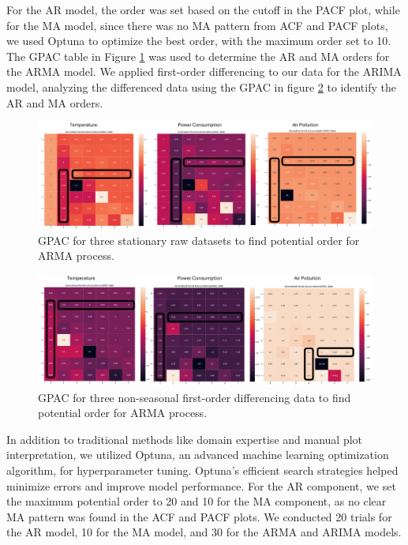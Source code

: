 \documentclass[sn-mathphys-num]{sn-jnl}
\theoremstyle{thmstyleone}%
\theoremstyle{thmstyletwo}%
\theoremstyle{thmstylethree}%
\begin{document}
For the AR model, the order was set based on the cutoff in the PACF plot, while for the MA model, since there was no MA pattern from ACF and PACF plots, we used Optuna to optimize the best order, with the maximum order set to 10. The GPAC table in Figure \ref{fig:gpac1}  was used to determine the AR and MA orders for the ARMA model. We applied first-order differencing to our data for the ARIMA model, analyzing the differenced data using the GPAC in figure \ref{fig:gpac2} to identify the AR and MA orders.
\begin{figure}[H]
	\begin{center}
		\includegraphics[scale=0.6]{gpac1.pdf}
	\end{center}
	\caption{GPAC for three stationary raw datasets to find potential order for ARMA process.}
	\label{fig:gpac1}
\end{figure}

\begin{figure}[H]
	\begin{center}
		\includegraphics[scale=0.6]{./gpac2.pdf}
	\end{center}
	\caption{GPAC for three non-seasonal first-order differencing data to find potential order for ARMA process.}
	\label{fig:gpac2}
\end{figure}

In addition to traditional methods like domain expertise and manual plot interpretation, we utilized Optuna, an advanced machine learning optimization algorithm, for hyperparameter tuning. Optuna's efficient search strategies helped minimize errors and improve model performance. For the AR component, we set the maximum potential order to 20 and 10 for the MA component, as no clear MA pattern was found in the ACF and PACF plots. We conducted 20 trials for the AR model, 10 for the MA model, and 30 for the ARMA and ARIMA models.
\end{document}
